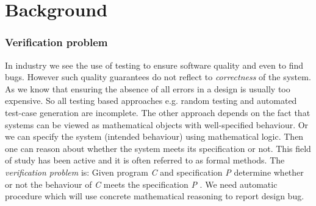 \documentclass[14pt]{article}
\begin{document}
\section{Background}\label{background}
\subsubsection*{Verification problem}\label{verification problem}
In industry we see the use of testing to ensure software quality and even to find bugs. However such quality guarantees do not reflect to \textit{correctness} of  the system. As we know that ensuring the absence of all errors in a design is usually too expensive. So all testing based approaches e.g. random testing and automated test-case generation are incomplete. The other approach depends on the fact that systems can be viewed as mathematical objects with well-specified behaviour. Or we can specify the system (intended behaviour) using mathematical logic. Then one can reason about whether the system meets its specification or not. This field of study has been active and it is often referred to as formal methods.
The \textit{verification problem} is: Given program \textit{C} and specification \textit{P} determine whether or not the behaviour of \textit{C} meets the specification \textit{P} \cite{model checking emerson}. We need automatic procedure which will use concrete mathematical reasoning to report design bug.
\end{document}
